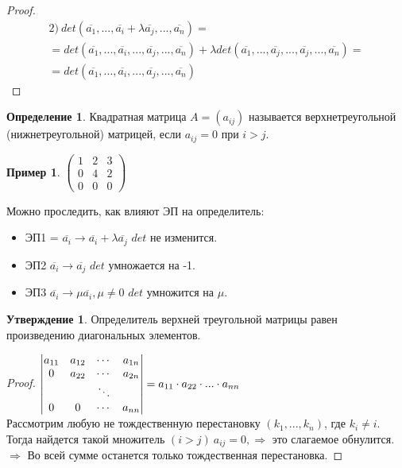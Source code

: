 \documentclass[a4paper, 12pt]{article}
\newcommand\tab[1][.5cm]{\hspace*{#1}}
\theoremstyle{definition}
\newtheorem*{definition}{Определение}
\newtheorem*{subtheorem}{Утверждение}
\newtheorem*{example1}{Пример}
\begin{document}
  \begin{proof} \tab
    \begin{multline*}
      2) \ det(\overline{a_1},...,\overline{a_i}+\lambda \overline{a_j},...,\overline{a_n}) = \\ = det(\overline{a_1},...,\overline{a_i},...,\overline{a_j},...,\overline{a_n}) + \lambda det(\overline{a_1},...,\overline{a_j},...,\overline{a_j},...,\overline{a_n}) = \\ = det(\overline{a_1},...,\overline{a_i},...,\overline{a_j},...,\overline{a_n})
    \end{multline*}
  \end{proof} 
  \begin{definition}
    Квадратная матрица $A = (a_{ij})$ называется верхнетреугольной (нижнетреугольной) матрицей, если $a_{ij} = 0$ при $i>j$. 
    \begin{example1}
      $\begin{pmatrix}
        1 & 2 & 3 \\ 0 & 4 & 2 \\ 0 & 0& 0
      \end{pmatrix}$
    \end{example1}  
  \end{definition} 
  Можно проследить, как влияют ЭП на определитель:
  \begin{itemize}
    \item ЭП1 = $\overline{a_i} \to \overline{a_i} + \lambda \overline{a_j}$ \tab[0.3cm] $det$ не изменится. 
    \item ЭП2 $\overline{a_i} \to \overline{a_j}$ \tab[2.15cm] $det$ умножается на -1. 
    \item ЭП3 $\overline{a_i} \to \mu \overline{a_i}, \mu \not = 0$ \tab[0.45cm] $det$ умножится на $\mu$. 
  \end{itemize}
  \begin{subtheorem}
    Определитель верхней треугольной матрицы равен произведению диагональных элементов.
  \end{subtheorem} 
  \begin{proof}
    $\begin{vmatrix}
      a_{11} & a_{12} & \cdots & a_{1n} \\
      0 & a_{22} & \cdots & a_{2n} \\
      \null & \null & \ddots & \null \\
      0 & 0 & \cdots & a_{nn} 
    \end{vmatrix} = a_{11}\cdot a_{22}\cdot...\cdot a_{nn}$ \\
    Рассмотрим любую не тождественную перестановку $(k_1,...,k_n)$, где $k_i \not = i$. Тогда найдется такой множитель $(i>j) \ a_{ij} = 0,  \Longrightarrow $ это слагаемое обнулится. $\Longrightarrow $ Во всей сумме останется только тождественная перестановка. 
  \end{proof} 
\end{document}
